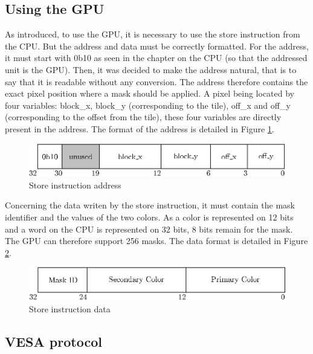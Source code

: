 \subsection{Using the GPU}

As introduced, to use the GPU, it is necessary to use the store instruction from the CPU. But the 
address and data must be correctly formatted. For the address, it must start with 0b10 as seen in 
the chapter on the CPU (so that the addressed unit is the GPU). Then, it was decided to make the 
address natural, that is to say that it is 
readable without any conversion. The address therefore contains the exact pixel position where 
a mask should be applied. A pixel being located by four variables: block\_x, block\_y (corresponding 
to the tile), off\_x and off\_y (corresponding to the offset from the tile), these four variables 
are directly present in the address. The format of the address is detailed in 
Figure \ref{fig:gpu/store_address}.

\begin{figure}[H]
    \centering
    \includegraphics[scale=1.0]{Chapter4-GPU_CLKU/res/store_address}
    \caption{Store instruction address}
    \label{fig:gpu/store_address}
\end{figure}

Concerning the data writen by the store instruction, it must contain the mask identifier and the 
values of the two colors. As a color is 
represented on 12 bits and a word on the CPU is represented on 32 bits, 8 bits remain for the mask.  
The GPU can therefore support 256 masks. The data format is detailed in 
Figure \ref{fig:gpu/store_data}.

\begin{figure}[H]
    \centering
    \includegraphics[scale=1.0]{Chapter4-GPU_CLKU/res/store_data}
    \caption{Store instruction data}
    \label{fig:gpu/store_data}
\end{figure}

\subsection{VESA protocol}

